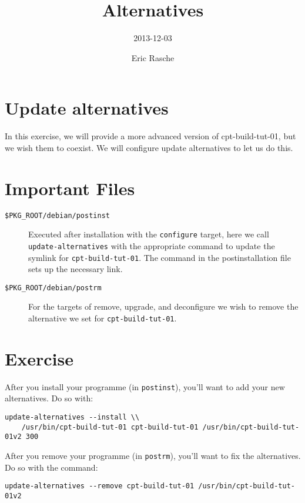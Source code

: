 \documentclass[]{article}
\title{Alternatives}
\author{2013-12-03}
\date{Eric Rasche}
\begin{document}
\maketitle

\section{Update alternatives}

In this exercise, we will provide a more advanced version of
cpt-build-tut-01, but we wish them to coexist. We will configure update
alternatives to let us do this.

\section{Important Files}

\begin{description}
\item[\texttt{\$PKG\_ROOT/debian/postinst}]
Executed after installation with the \texttt{configure} target, here we
call \texttt{update-alternatives} with the appropriate command to update
the symlink for \texttt{cpt-build-tut-01}. The command in the
postinstallation file sets up the necessary link.

\item[\texttt{\$PKG\_ROOT/debian/postrm}]
For the targets of remove, upgrade, and deconfigure we wish to remove
the alternative we set for \texttt{cpt-build-tut-01}.

\end{description}
\section{Exercise}

After you install your programme (in \texttt{postinst}), you'll want to
add your new alternatives. Do so with:

\begin{verbatim}
update-alternatives --install \\
    /usr/bin/cpt-build-tut-01 cpt-build-tut-01 /usr/bin/cpt-build-tut-01v2 300
\end{verbatim}
After you remove your programme (in \texttt{postrm}), you'll want to fix
the alternatives. Do so with the command:

\begin{verbatim}
update-alternatives --remove cpt-build-tut-01 /usr/bin/cpt-build-tut-01v2
\end{verbatim}
\end{document}
